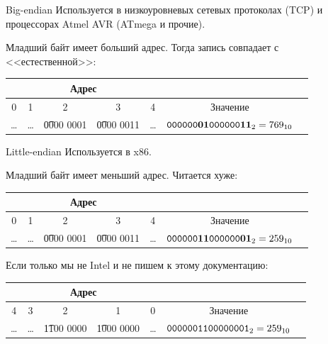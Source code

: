 \begin{frame}{Big-endian}
	Используется в низкоуровневых сетевых протоколах (TCP) и процессорах Atmel AVR (ATmega и прочие).

	Младший байт имеет больший адрес.
	Тогда запись совпадает с <<естественной>>:
	\begin{center}
		\begin{tabular}{|c|c|c|c|c|c|c|}
			\hline
			\multicolumn{5}{|c|}{Адрес} & \\\hline
			0 & 1 & 2 & 3 & 4 & Значение \\\hline
			\dots & \dots & \t{0000 0001} & \t{0000 0011} & \dots & $\t{0000 00\textbf{01} 0000 00\textbf{11}}_2=769_{10}$ \\\hline
		\end{tabular}
	\end{center}
\end{frame}

\begin{frame}{Little-endian}
	Используется в x86.

	Младший байт имеет меньший адрес.
	Читается хуже:
	\begin{center}
		\begin{tabular}{|c|c|c|c|c|c|c|}
			\hline
			\multicolumn{5}{|c|}{Адрес} & \\\hline
			0 & 1 & 2 & 3 & 4 & Значение \\\hline
			\dots & \dots & \t{0000 0001} & \t{0000 0011} & \dots & $\t{0000 00\textbf{11} 0000 00\textbf{01}}_2=259_{10}$ \\\hline
		\end{tabular}
	\end{center}
	Если только мы не Intel и не пишем к этому документацию:
	\begin{center}
		\begin{tabular}{|c|c|c|c|c|c|c|}
			\hline
			\multicolumn{5}{|c|}{Адрес} & \\\hline
			4 & 3 & 2 & 1 & 0 & Значение \\\hline
			\dots & \dots & \t{1100 0000} & \t{1000 0000} & \dots & $\t{0000 0011 0000 0001}_2=259_{10}$ \\\hline
		\end{tabular}
	\end{center}
\end{frame}
